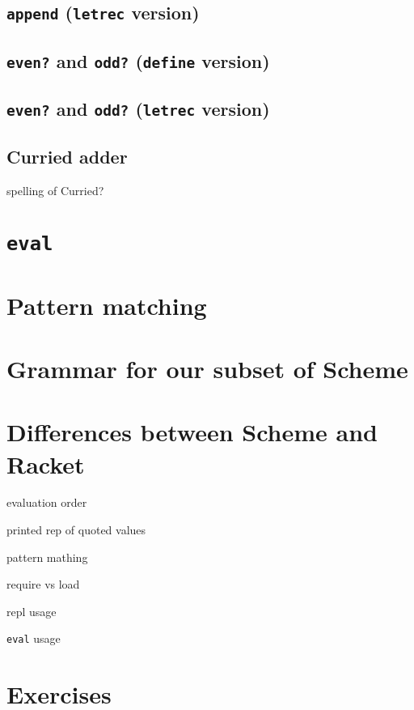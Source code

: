 \documentclass{book}
\begin{document}
\subsection{\texttt{append} (\texttt{letrec} version)}

\subsection{\texttt{even?} and \texttt{odd?} (\texttt{define} version)}

\subsection{\texttt{even?} and \texttt{odd?} (\texttt{letrec} version)}

\subsection{Curried adder}

spelling of Curried?

\section{\texttt{eval}}

\section{Pattern matching}

\section{Grammar for our subset of Scheme}

\section{Differences between Scheme and Racket}

evaluation order

printed rep of quoted values

pattern mathing

require vs load

repl usage

\verb|eval| usage

\section{Exercises}
\end{document}
